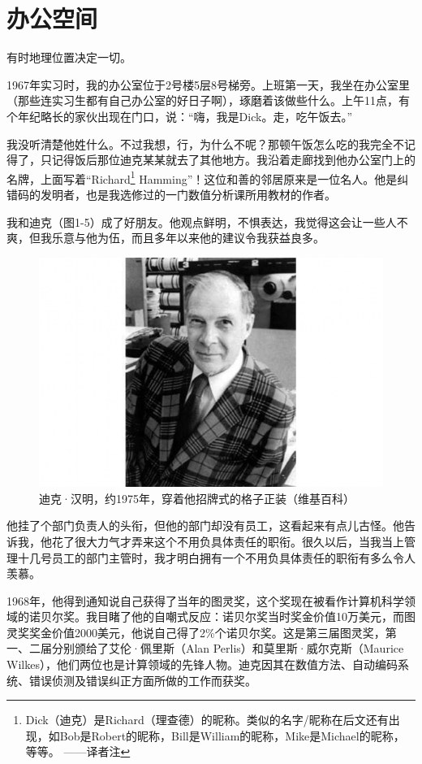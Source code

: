 \documentclass[a4paper,12pt,UTF8,twoside]{ctexbook}
\begin{document}
\section{办公空间}

有时地理位置决定一切。

1967年实习时，我的办公室位于2号楼5层8号梯旁。上班第一天，我坐在办公室里（那些连实习生都有自己办公室的好日子啊），琢磨着该做些什么。上午11点，有个年纪略长的家伙出现在门口，说：“嗨，我是Dick。走，吃午饭去。”

我没听清楚他姓什么。不过我想，行，为什么不呢？那顿午饭怎么吃的我完全不记得了，只记得饭后那位迪克某某就去了其他地方。我沿着走廊找到他办公室门上的名牌，上面写着“Richard\footnote{Dick（迪克）是Richard（理查德）的昵称。类似的名字/昵称在后文还有出现，如Bob是Robert的昵称，Bill是William的昵称，Mike是Michael的昵称，等等。 ——译者注} Hamming”！这位和善的邻居原来是一位名人。他是纠错码的发明者，也是我选修过的一门数值分析课所用教材的作者。

我和迪克（图1-5）成了好朋友。他观点鲜明，不惧表达，我觉得这会让一些人不爽，但我乐意与他为伍，而且多年以来他的建议令我获益良多。

\begin{figure}[htbp]
	\centering
	\includegraphics[width=0.7\linewidth]{5}
	\caption{迪克·汉明，约1975年，穿着他招牌式的格子正装（维基百科）}
	\label{fig:1}
\end{figure}

他挂了个部门负责人的头衔，但他的部门却没有员工，这看起来有点儿古怪。他告诉我，他花了很大力气才弄来这个不用负具体责任的职衔。很久以后，当我当上管理十几号员工的部门主管时，我才明白拥有一个不用负具体责任的职衔有多么令人羡慕。

1968年，他得到通知说自己获得了当年的图灵奖，这个奖现在被看作计算机科学领域的诺贝尔奖。我目睹了他的自嘲式反应：诺贝尔奖当时奖金价值10万美元，而图灵奖奖金价值2000美元，他说自己得了2\%个诺贝尔奖。这是第三届图灵奖，第一、二届分别颁给了艾伦·佩里斯（Alan Perlis）和莫里斯·威尔克斯（Maurice Wilkes），他们两位也是计算领域的先锋人物。迪克因其在数值方法、自动编码系统、错误侦测及错误纠正方面所做的工作而获奖。
\end{document}
